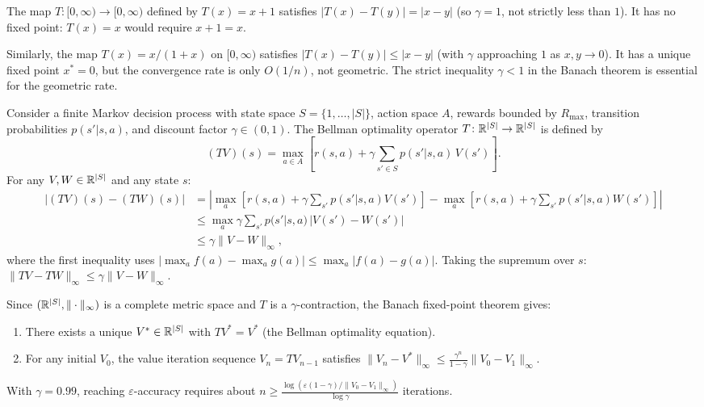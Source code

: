 \documentclass[11pt,a4paper]{article}
\begin{document}
\begin{example}[Non-Example: $\gamma = 1$ Fails]
\label{ex:gamma_one}
The map $T \colon [0, \infty) \to [0, \infty)$ defined by $T(x) = x+1$
satisfies $|T(x) - T(y)| = |x - y|$ (so $\gamma = 1$, not strictly
less than $1$). It has no fixed point: $T(x) = x$ would require
$x + 1 = x$.

Similarly, the map $T(x) = x/(1+x)$ on $[0, \infty)$ satisfies
$|T(x) - T(y)| \le |x - y|$ (with $\gamma$ approaching $1$ as
$x, y \to 0$). It has a unique fixed point $x^* = 0$, but the
convergence rate is only $O(1/n)$, not geometric. The strict inequality
$\gamma < 1$ in the Banach theorem is essential for the geometric rate.
\end{example}

\begin{example}
\label{ex:value_iteration}
Consider a finite Markov decision process with state space
$S = \{1, \ldots, |S|\}$, action space $A$, rewards bounded by
$R_{\max}$, transition probabilities $p(s'|s,a)$, and discount factor
$\gamma \in (0, 1)$. The Bellman optimality operator
$T \colon \mathbb{R}^{|S|} \to \mathbb{R}^{|S|}$ is defined by
\[
  (TV)(s) = \max_{a \in A}\left[r(s, a) + \gamma \sum_{s' \in S}
  p(s'|s,a)\, V(s')\right].
\]
For any $V, W \in \mathbb{R}^{|S|}$ and any state $s$:
\begin{align*}
  |(TV)(s) - (TW)(s)|
  &= \left|\max_a\left[r(s,a) + \gamma \sum_{s'} p(s'|s,a) V(s')\right]
  - \max_a\left[r(s,a) + \gamma \sum_{s'} p(s'|s,a) W(s')\right]\right| \\
  &\le \max_a \gamma \sum_{s'} p(s'|s,a)\, |V(s') - W(s')| \\
  &\le \gamma \|V - W\|_\infty,
\end{align*}
where the first inequality uses $|\max_a f(a) - \max_a g(a)| \le
\max_a |f(a) - g(a)|$. Taking the supremum over $s$:
$\|TV - TW\|_\infty \le \gamma \|V - W\|_\infty$.

Since $(\mathbb{R}^{|S|}, \|\cdot\|_\infty)$ is a complete metric space and $T$
is a $\gamma$-contraction, the Banach fixed-point theorem gives:
\begin{enumerate}[nosep,label=(\roman*)]
  \item There exists a unique $V^* \in \mathbb{R}^{|S|}$ with $TV^* = V^*$
    (the Bellman optimality equation).
  \item For any initial $V_0$, the value iteration sequence
    $V_n = TV_{n-1}$ satisfies
    $\|V_n - V^*\|_\infty \le \frac{\gamma^n}{1 - \gamma}\|V_0 - V_1\|_\infty$.
\end{enumerate}
With $\gamma = 0.99$, reaching $\varepsilon$-accuracy requires about
$n \ge \frac{\log(\varepsilon(1-\gamma)/\|V_0 - V_1\|_\infty)}{\log \gamma}$
iterations.
\end{example}
\end{document}
